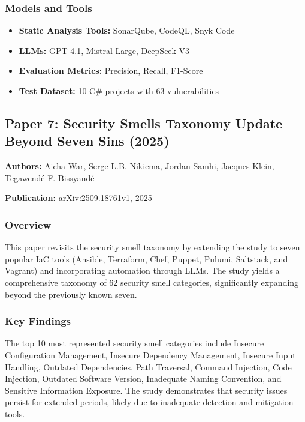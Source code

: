 \documentclass[11pt,a4paper]{article}
\begin{document}
\subsubsection{Models and Tools}
\begin{itemize}
    \item \textbf{Static Analysis Tools:} SonarQube, CodeQL, Snyk Code
    \item \textbf{LLMs:} GPT-4.1, Mistral Large, DeepSeek V3
    \item \textbf{Evaluation Metrics:} Precision, Recall, F1-Score
    \item \textbf{Test Dataset:} 10 C\# projects with 63 vulnerabilities
\end{itemize}

\subsection{Paper 7: Security Smells Taxonomy Update Beyond Seven Sins (2025)}

\textbf{Authors:} Aicha War, Serge L.B. Nikiema, Jordan Samhi, Jacques Klein, Tegawendé F. Bissyandé

\textbf{Publication:} arXiv:2509.18761v1, 2025

\subsubsection{Overview}
This paper revisits the security smell taxonomy by extending the study to seven popular IaC tools (Ansible, Terraform, Chef, Puppet, Pulumi, Saltstack, and Vagrant) and incorporating automation through LLMs. The study yields a comprehensive taxonomy of 62 security smell categories, significantly expanding beyond the previously known seven.

\subsubsection{Key Findings}
The top 10 most represented security smell categories include Insecure Configuration Management, Insecure Dependency Management, Insecure Input Handling, Outdated Dependencies, Path Traversal, Command Injection, Code Injection, Outdated Software Version, Inadequate Naming Convention, and Sensitive Information Exposure. The study demonstrates that security issues persist for extended periods, likely due to inadequate detection and mitigation tools.
\end{document}
